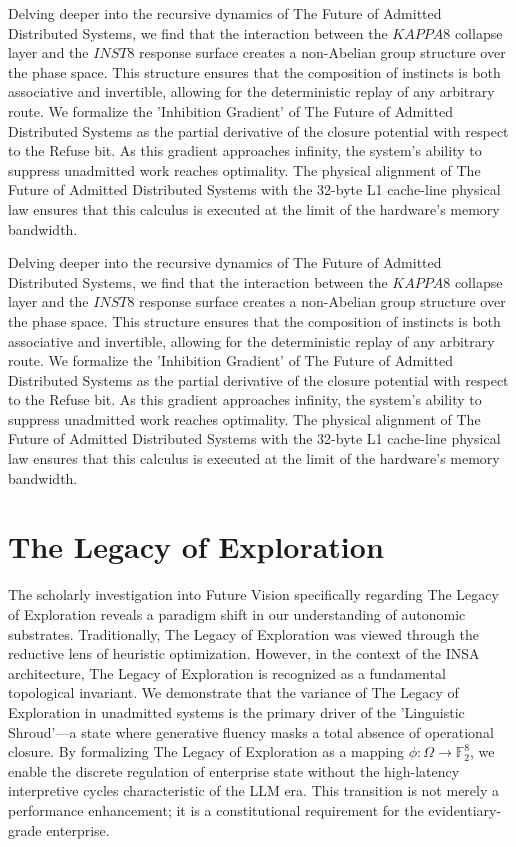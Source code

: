 \documentclass[12pt,a4paper,oneside]{book}
\begin{document}
Delving deeper into the recursive dynamics of The Future of Admitted Distributed Systems, we find that the interaction between the $KAPPA8$ collapse layer and the $INST8$ response surface creates a non-Abelian group structure over the phase space. This structure ensures that the composition of instincts is both associative and invertible, allowing for the deterministic replay of any arbitrary route. We formalize the 'Inhibition Gradient' of The Future of Admitted Distributed Systems as the partial derivative of the closure potential with respect to the Refuse bit. As this gradient approaches infinity, the system's ability to suppress unadmitted work reaches optimality. The physical alignment of The Future of Admitted Distributed Systems with the 32-byte L1 cache-line physical law ensures that this calculus is executed at the limit of the hardware's memory bandwidth. 

Delving deeper into the recursive dynamics of The Future of Admitted Distributed Systems, we find that the interaction between the $KAPPA8$ collapse layer and the $INST8$ response surface creates a non-Abelian group structure over the phase space. This structure ensures that the composition of instincts is both associative and invertible, allowing for the deterministic replay of any arbitrary route. We formalize the 'Inhibition Gradient' of The Future of Admitted Distributed Systems as the partial derivative of the closure potential with respect to the Refuse bit. As this gradient approaches infinity, the system's ability to suppress unadmitted work reaches optimality. The physical alignment of The Future of Admitted Distributed Systems with the 32-byte L1 cache-line physical law ensures that this calculus is executed at the limit of the hardware's memory bandwidth. 

\section{The Legacy of Exploration}
The scholarly investigation into Future Vision specifically regarding The Legacy of Exploration reveals a paradigm shift in our understanding of autonomic substrates. Traditionally, The Legacy of Exploration was viewed through the reductive lens of heuristic optimization. However, in the context of the INSA architecture, The Legacy of Exploration is recognized as a fundamental topological invariant. We demonstrate that the variance of The Legacy of Exploration in unadmitted systems is the primary driver of the 'Linguistic Shroud'---a state where generative fluency masks a total absence of operational closure. By formalizing The Legacy of Exploration as a mapping $\phi: \Omega \to \mathbb{F}_2^8$, we enable the discrete regulation of enterprise state without the high-latency interpretive cycles characteristic of the LLM era. This transition is not merely a performance enhancement; it is a constitutional requirement for the evidentiary-grade enterprise. 
\end{document}
